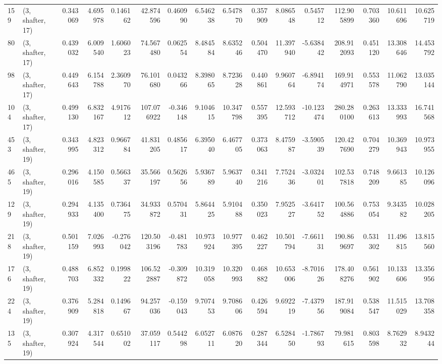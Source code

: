 \begin{tabular}{llrrrrrrrrrrrrrr}
159 &  (3, shafter, 17) &   0.343069 &   4.695978 &   0.146162 &    42.874596 &   0.460990 &   6.546238 &   6.547870 &  0.357909 &   8.086548 &   0.545712 &   112.905899 &   0.703360 &  10.611696 &  10.625719 \\
80  &  (3, shafter, 17) &   0.439032 &   6.009540 &   1.606023 &    74.567480 &   0.062554 &   8.484584 &   8.635246 &  0.504470 &  11.397940 &  -5.638442 &   208.912093 &   0.451120 &  13.308646 &  14.453792 \\
98  &  (3, shafter, 17) &   0.449643 &   6.154788 &   2.360970 &    76.101680 &   0.043266 &   8.398065 &   8.723628 &  0.440861 &   9.960764 &  -6.894174 &   169.914971 &   0.553578 &  11.062790 &  13.035144 \\
104 &  (3, shafter, 17) &   0.499130 &   6.832167 &   4.917612 &   107.076922 &  -0.346148 &   9.104615 &  10.347798 &  0.557395 &  12.593712 & -10.123474 &   280.280100 &   0.263613 &  13.333993 &  16.741568 \\
453 &  (3, shafter, 19) &   0.343995 &   4.823312 &   0.966784 &    41.831205 &   0.485617 &   6.395040 &   6.467705 &  0.373063 &   8.475987 &  -3.590539 &   120.427690 &   0.704279 &  10.369943 &  10.973955 \\
465 &  (3, shafter, 19) &   0.296016 &   4.150585 &   0.566337 &    35.566197 &   0.562656 &   5.936789 &   5.963740 &  0.341216 &   7.752436 &  -3.032401 &   102.537818 &   0.748209 &   9.661385 &  10.126096 \\
129 &  (3, shafter, 19) &   0.294933 &   4.135400 &   0.736475 &    34.933872 &   0.570431 &   5.864425 &   5.910488 &  0.350023 &   7.952527 &  -3.641752 &   100.564886 &   0.753054 &   9.343582 &  10.028205 \\
218 &  (3, shafter, 19) &   0.501159 &   7.026993 &  -0.276042 &   120.503196 &  -0.481783 &  10.973924 &  10.977395 &  0.462227 &  10.501794 &  -7.661131 &   190.869697 &   0.531302 &  11.496815 &  13.815560 \\
176 &  (3, shafter, 19) &   0.488703 &   6.852332 &   0.199822 &   106.522887 &  -0.309872 &  10.319058 &  10.320993 &  0.468882 &  10.653006 &  -8.701626 &   178.408276 &   0.561902 &  10.133606 &  13.356956 \\
224 &  (3, shafter, 19) &   0.376909 &   5.284818 &   0.149667 &    94.257036 &  -0.159043 &   9.707453 &   9.708606 &  0.426594 &   9.692219 &  -7.437956 &   187.919084 &   0.538547 &  11.515029 &  13.708358 \\
135 &  (3, shafter, 19) &   0.307924 &   4.317544 &   0.651002 &    37.059117 &   0.544298 &   6.052711 &   6.087620 &  0.287344 &   6.528450 &  -1.786793 &    79.981615 &   0.803598 &   8.762932 &   8.943244 \\

\end{tabular}
